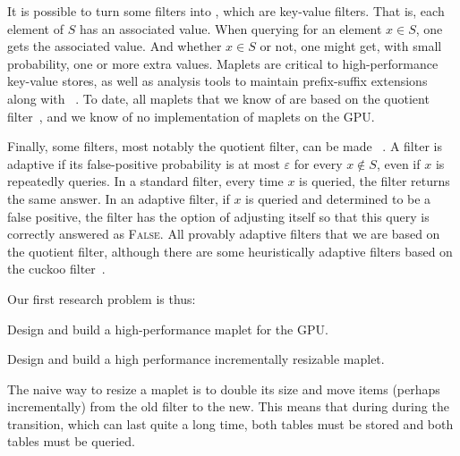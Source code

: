 It is possible to turn some filters into , which are key-value filters.  That is, each element of $S$ has an associated value.  When querying for an element $x\in S$, one gets the associated value.  And whether $x\in S$ or not, one might get, with small probability, one or more extra values.  Maplets are critical to high-performance key-value stores, as well as \kmer analysis tools to maintain prefix-suffix extensions along with \kmers~\cite{mccoy2022high}.  To date, all maplets that we know of are based on the quotient filter~\cite{conway2020splinterdb,mccoy2022high}, and we know of no implementation of maplets on the GPU\@.

Finally, some filters, most notably the quotient filter, can be made ~\cite{BenderFaGo18}.  A filter is adaptive if its false-positive probability is at most $\varepsilon$ for every $x\notin S$, even if $x$ is repeatedly queries.  In a standard filter, every time $x$ is queried, the filter returns the same answer.  In an adaptive filter, if $x$ is queried and determined to be a false positive, the filter has the option of adjusting itself so that this query is correctly answered as \textsc{False}.    All provably adaptive filters that we are based on the quotient filter, although there are some heuristically adaptive filters based on the cuckoo filter~\cite{mitzenmacher-adaptive}. 


Our first research problem is thus:

\begin{rproblem}
Design and build a high-performance maplet for the GPU\@.
\end{rproblem}


\begin{rproblem}
Design and build a high performance incrementally resizable maplet.
\end{rproblem}
The naive way to resize a maplet is to double its size and move items (perhaps incrementally) from the old filter to the new.  This means that during during the transition, which can last quite a long time, both tables must be stored and both tables must be queried.

